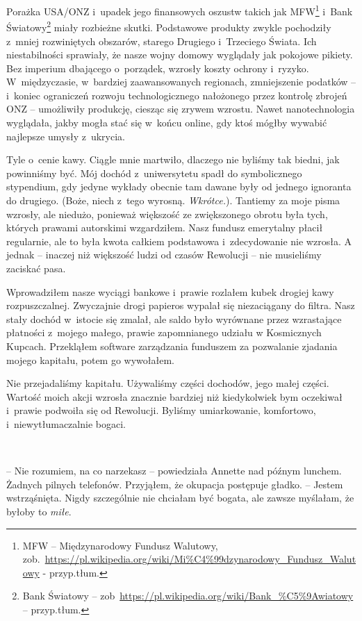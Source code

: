 \documentclass[oneside,polish,11pt,sfheadings]{mwbk}
\begin{document}
Porażka USA/ONZ i~upadek jego finansowych oszustw takich jak MFW\footnote{ MFW -- Międzynarodowy Fundusz Walutowy,
zob.~\url{https://pl.wikipedia.org/wiki/Mi\%C4\%99dzynarodowy_Fundusz_Walutowy} - przyp.tłum.} i~Bank
Światowy\footnote{Bank Światowy -- zob~\url{https://pl.wikipedia.org/wiki/Bank_\%C5\%9Awiatowy} -- przyp.tłum.} miały rozbieżne skutki. 
Podstawowe produkty zwykle pochodziły z~mniej
rozwiniętych obszarów, starego Drugiego i~Trzeciego Świata. Ich
niestabilności sprawiały, że nasze wojny domowy wyglądały jak pokojowe
pikiety. Bez imperium dbającego o~porządek, wzrosły koszty ochrony i~ryzyko. W~międzyczasie, w~bardziej zaawansowanych regionach,
zmniejszenie podatków -- i~koniec ograniczeń rozwoju technologicznego
nałożonego przez kontrolę zbrojeń ONZ -- umożliwiły produkcję, ciesząc
się zrywem wzrostu. Nawet nanotechnologia wyglądała, jakby mogła stać
się w~końcu online, gdy ktoś mógłby wywabić najlepsze umysły z~ukrycia.

Tyle o~cenie kawy. Ciągle mnie martwiło, dlaczego nie byliśmy tak
biedni, jak powinniśmy być. Mój dochód z~uniwersytetu spadł do
symbolicznego stypendium, gdy jedyne wykłady obecnie tam dawane były od
jednego ignoranta do drugiego. (Boże, niech z~tego wyrosną.
\emph{Wkrótce.}). Tantiemy za moje pisma wzrosły, ale niedużo, ponieważ
większość ze zwiększonego obrotu była tych, których prawami autorskimi
wzgardziłem. Nasz fundusz emerytalny płacił regularnie, ale to była
kwota całkiem podstawowa i~zdecydowanie nie wzrosła. A jednak -- inaczej
niż większość ludzi od czasów Rewolucji -- nie musieliśmy zaciskać pasa.

Wprowadziłem nasze wyciągi bankowe i~prawie rozlałem kubek drogiej kawy
rozpuszczalnej. Zwyczajnie drogi papieros wypalał się niezaciągany do
filtra. Nasz stały dochód w~istocie się zmalał, ale saldo było wyrównane
przez wzrastające płatności z~mojego małego, prawie zapomnianego udziału
w Kosmicznych Kupcach. Przekląłem software zarządzania funduszem za
pozwalanie zjadania mojego kapitału, potem go wywołałem.

Nie przejadaliśmy kapitału. Używaliśmy części dochodów, jego małej
części. Wartość moich akcji wzrosła znacznie bardziej niż kiedykolwiek
bym oczekiwał i~prawie podwoiła się od Rewolucji. Byliśmy umiarkowanie,
komfortowo, i~niewytłumaczalnie bogaci.

~

-- Nie rozumiem, na co narzekasz -- powiedziała Annette nad późnym
lunchem. Żadnych pilnych telefonów. Przyjąłem, że okupacja postępuje
gładko. -- Jestem wstrząśnięta. Nigdy szczególnie nie chciałam być
bogata, ale zawsze myślałam, że byłoby to \emph{miłe}.
\end{document}
